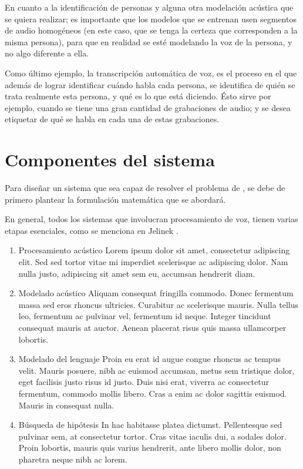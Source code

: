 En cuanto a la identificación de personas y alguna otra modelación acústica que se quiera realizar; es importante que los modelos que se entrenan usen segmentos de audio homogéneos (en este caso, que se tenga la certeza que corresponden a la misma persona), para que en realidad se esté modelando la voz de la persona, y no algo diferente a ella.

Como último ejemplo, la transcripción automática de voz, es el proceso en el que además de lograr identificar cuándo habla cada persona, se identifica de quién se trata realmente esta persona, y qué es lo que está diciendo. Ésto sirve por ejemplo, cuando se tiene una gran cantidad de grabaciones de audio; y se desea etiquetar de qué se habla en cada una de estas grabaciones. 

\section{Componentes del sistema}

Para diseñar un sistema que sea capaz de resolver el problema de \sd, se debe de primero plantear la formulación matemática que se abordará. 

En general, todos los sistemas que involucran procesamiento de voz, tienen varias etapas esenciales, como se menciona en Jelinek \cite{Jelinek1998}. 

\begin{enumerate}
\item Procesamiento acústico
Lorem ipsum dolor sit amet, consectetur adipiscing elit. Sed sed tortor vitae mi imperdiet scelerisque ac adipiscing dolor. Nam nulla justo, adipiscing sit amet sem eu, accumsan hendrerit diam.

\item Modelado acústico
 Aliquam consequat fringilla commodo. Donec fermentum massa sed eros rhoncus ultricies. Curabitur ac scelerisque mauris. Nulla tellus leo, fermentum ac pulvinar vel, fermentum id neque. Integer tincidunt consequat mauris at auctor. Aenean placerat risus quis massa ullamcorper lobortis. 
 
\item Modelado del lenguaje
Proin eu erat id augue congue rhoncus ac tempus velit. Mauris posuere, nibh ac euismod accumsan, metus sem tristique dolor, eget facilisis justo risus id justo. Duis nisi erat, viverra ac consectetur fermentum, commodo mollis libero. Cras a enim ac dolor sagittis euismod. Mauris in consequat nulla. 

\item Búsqueda de hipótesis
In hac habitasse platea dictumst. Pellentesque sed pulvinar sem, at consectetur tortor. Cras vitae iaculis dui, a sodales dolor. Proin lobortis, mauris quis varius hendrerit, ante libero mollis dolor, non pharetra neque nibh ac lorem.

\end{enumerate}


